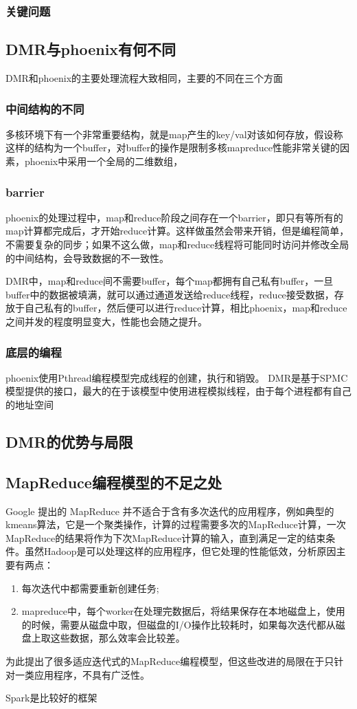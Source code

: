 \subsubsection{关键问题}


\subsection{DMR与phoenix有何不同}
DMR和phoenix的主要处理流程大致相同，主要的不同在三个方面

\subsubsection{中间结构的不同}
多核环境下有一个非常重要结构，就是map产生的key/val对该如何存放，假设称这样的结构为一个buffer，对buffer的操作是限制多核mapreduce性能非常关键的因素，phoenix中采用一个全局的二维数组，

\subsubsection{barrier}
phoenix的处理过程中，map和reduce阶段之间存在一个barrier，即只有等所有的map计算都完成后，才开始reduce计算。这样做虽然会带来开销，但是编程简单，不需要复杂的同步；如果不这么做，map和reduce线程将可能同时访问并修改全局的中间结构，会导致数据的不一致性。

DMR中，map和reduce间不需要buffer，每个map都拥有自己私有buffer，一旦buffer中的数据被填满，就可以通过通道发送给reduce线程，reduce接受数据，存放于自己私有的buffer，然后便可以进行reduce计算，相比phoenix，map和reduce之间并发的程度明显变大，性能也会随之提升。

\subsubsection{底层的编程}
{\color{red}
phoenix使用Pthread编程模型完成线程的创建，执行和销毁。
DMR是基于SPMC模型提供的接口，最大的在于该模型中使用进程模拟线程，由于每个进程都有自己的地址空间}

\subsection{DMR的优势与局限}


\subsection{MapReduce编程模型的不足之处}
Google 提出的 MapReduce 并不适合于含有多次迭代的应用程序，例如典型的kmeans算法，它是一个聚类操作，计算的过程需要多次的MapReduce计算，一次MapReduce的结果将作为下次MapReduce计算的输入，直到满足一定的结束条件。虽然Hadoop是可以处理这样的应用程序，但它处理的性能低效，分析原因主要有两点：
\begin{enumerate}
  \item 每次迭代中都需要重新创建任务;
  \item mapreduce中，每个worker在处理完数据后，将结果保存在本地磁盘上，使用的时候，需要从磁盘中取，但磁盘的I/O操作比较耗时，如果每次迭代都从磁盘上取这些数据，那么效率会比较差。
\end{enumerate}

为此提出了很多适应迭代式的MapReduce编程模型，但这些改进的局限在于只针对一类应用程序，不具有广泛性。

Spark是比较好的框架


